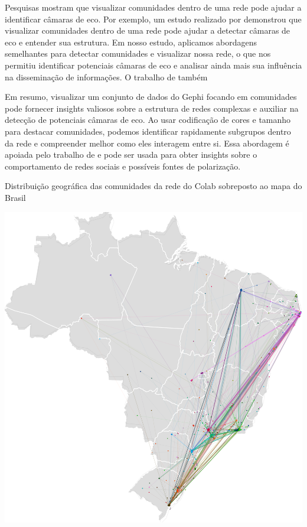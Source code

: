 Pesquisas mostram que visualizar comunidades dentro de uma rede pode ajudar a identificar câmaras de eco. Por exemplo, um estudo realizado por  demonstrou que visualizar comunidades dentro de uma rede pode ajudar a detectar câmaras de eco e entender sua estrutura. Em nosso estudo, aplicamos abordagens semelhantes para detectar comunidades e visualizar nossa rede, o que nos permitiu identificar potenciais câmaras de eco e analisar ainda mais sua influência na disseminação de informações. O trabalho de \cite{2014_Colleoni} também 

Em resumo, visualizar um conjunto de dados do Gephi focando em comunidades pode fornecer insights valiosos sobre a estrutura de redes complexas e auxiliar na detecção de potenciais câmaras de eco. Ao usar codificação de cores e tamanho para destacar comunidades, podemos identificar rapidamente subgrupos dentro da rede e compreender melhor como eles interagem entre si. Essa abordagem é apoiada pelo trabalho de  e pode ser usada para obter insights sobre o comportamento de redes sociais e possíveis fontes de polarização.

\begin{quadro}[!hbtp]
	\caption{Distribuição geográfica das comunidades da rede do Colab sobreposto ao mapa do Brasil}
	\label{fig:colab_geoclusters}
	\centering
	\includegraphics[scale=0.2]{images/colab-geocluster.png}
	\fautor
\end{quadro}

